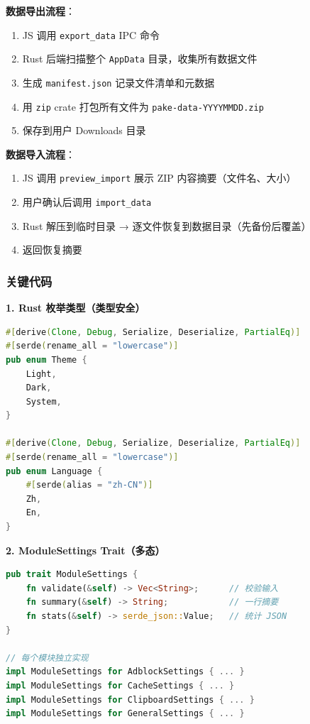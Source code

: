 \documentclass[12pt,a4paper]{ctexart}
\begin{document}
\textbf{数据导出流程}：

\begin{enumerate}[label=(\arabic*)]
  \item JS 调用 \texttt{export\_data} IPC 命令
  \item Rust 后端扫描整个 \texttt{AppData} 目录，收集所有数据文件
  \item 生成 \texttt{manifest.json} 记录文件清单和元数据
  \item 用 \texttt{zip} crate 打包所有文件为 \texttt{pake-data-YYYYMMDD.zip}
  \item 保存到用户 Downloads 目录
\end{enumerate}

\textbf{数据导入流程}：

\begin{enumerate}[label=(\arabic*)]
  \item JS 调用 \texttt{preview\_import} 展示 ZIP 内容摘要（文件名、大小）
  \item 用户确认后调用 \texttt{import\_data}
  \item Rust 解压到临时目录 → 逐文件恢复到数据目录（先备份后覆盖）
  \item 返回恢复摘要
\end{enumerate}

\subsubsection{关键代码}

\textbf{1. Rust 枚举类型（类型安全）}

\begin{lstlisting}[language=Rust, caption=Theme 和 Language 枚举]
#[derive(Clone, Debug, Serialize, Deserialize, PartialEq)]
#[serde(rename_all = "lowercase")]
pub enum Theme {
    Light,
    Dark,
    System,
}

#[derive(Clone, Debug, Serialize, Deserialize, PartialEq)]
#[serde(rename_all = "lowercase")]
pub enum Language {
    #[serde(alias = "zh-CN")]
    Zh,
    En,
}
\end{lstlisting}

\textbf{2. ModuleSettings Trait（多态）}

\begin{lstlisting}[language=Rust, caption=ModuleSettings trait]
pub trait ModuleSettings {
    fn validate(&self) -> Vec<String>;      // 校验输入
    fn summary(&self) -> String;            // 一行摘要
    fn stats(&self) -> serde_json::Value;   // 统计 JSON
}

// 每个模块独立实现
impl ModuleSettings for AdblockSettings { ... }
impl ModuleSettings for CacheSettings { ... }
impl ModuleSettings for ClipboardSettings { ... }
impl ModuleSettings for GeneralSettings { ... }
\end{lstlisting}
\end{document}
